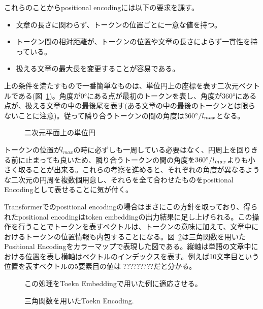 これらのことからpositional encodingには以下の要求を課す。
\begin{itemize}
  \item 文章の長さに関わらず、トークンの位置ごとに一意な値を持つ。
  \item トークン間の相対距離が、トークンの位置や文章の長さによらず一貫性を持っている。
  \item 扱える文章の最大長を変更することが容易である。
\end{itemize}

上の条件を満たすもので一番簡単なものは、単位円上の座標を表す二次元ベクトルである(図~\ref{fig:pos-encoding-circle})。角度が$\ang{0}$にある点が最初のトークンを表し、角度が$\ang{360}$にある点が、扱える文章の中の最後尾を表す(ある文章の中の最後のトークンとは限らないことに注意)。従って隣り合うトークンの間の角度は${360\degree / l_{max}}$となる。

\begin{figure}
  \centering

  \caption{二次元平面上の単位円}
\label{fig:pos-encoding-circle}

\end{figure}
トークンの位置が$l_{max}$の時に必ずしも一周している必要はなく、円周上を回りきる前に止まっても良いため、隣り合うトークンの間の角度を${360\degree / l_{max}}$よりも小さく取ることが出来る。これらの考察を進めると、それぞれの角度が異なるような二次元の円周を複数個用意し、それらを全て合わせたものをpositional Encodingとして表せることに気が付く。


Transformerでのpositional encodingの場合はまさにこの方針を取っており、得られたpositional encodingはtoken embeddingの出力結果に足し上げられる。この操作を行うことでトークンを表すベクトルは、トークンの意味に加えて、文章中におけるトークンの位置情報も内包することになる。図~\ref{fig:tri-pos-encoding}は三角関数を用いたPositional Encodingをカラーマップで表現した図である。縦軸は単語の文章中における位置を表し横軸はベクトルのインデックスを表す。例えば10文字目という位置を表すベクトルの5要素目の値は ?????????だと分かる。
\begin{figure}
  \centering

  \caption{三角関数を用いたToekn Encoding.}
\label{fig:tri-pos-encoding}

この処理をToekn Embeddingで用いた例に適応させる。
\end{figure}

